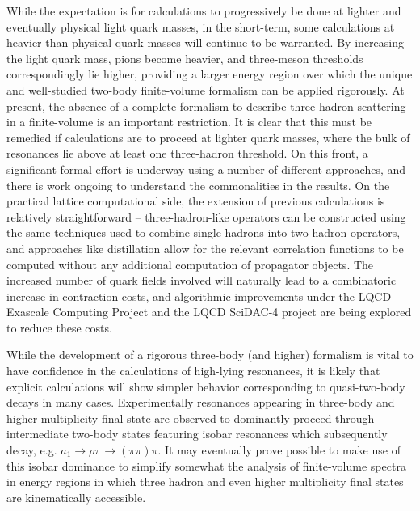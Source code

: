 While the expectation is for calculations to progressively be done at lighter and eventually physical light quark masses, in the short-term, some calculations at heavier than physical quark masses will continue to be warranted. By increasing the light quark mass, pions become heavier, and three-meson thresholds correspondingly lie higher, providing a larger energy region over which the unique and well-studied two-body finite-volume formalism can be applied rigorously. 
At present, the absence of a complete formalism to describe three-hadron scattering in a finite-volume is an important  restriction. It is clear that this must be remedied if calculations are to proceed at lighter quark masses, where the bulk of resonances lie above at least one three-hadron threshold. On this front, a significant formal effort is underway \cite{Polejaeva:2012ut,Hansen:2015zga,Hansen:2014eka,Briceno:2018aml,Doring:2018xxx} using a number of different approaches, and there is work ongoing to understand the commonalities in the results. On the practical lattice computational side, the extension of previous calculations is relatively straightforward -- three-hadron-like operators can be constructed using the same techniques used to combine single hadrons into two-hadron operators, and approaches like distillation \cite{Peardon:2009gh} allow for the relevant correlation functions to be computed without any additional computation of propagator objects. The increased number of quark fields involved will naturally lead to a combinatoric increase in contraction costs, and algorithmic improvements under the LQCD Exascale Computing Project and the LQCD SciDAC-4 project are being explored to reduce these costs.

While the development of a rigorous three-body (and higher) formalism is vital to have confidence in the calculations of high-lying resonances, it is likely that explicit calculations will show simpler behavior corresponding to quasi-two-body decays in many cases. Experimentally resonances appearing in three-body and higher multiplicity final state are observed to dominantly proceed through intermediate two-body states featuring isobar resonances which subsequently decay, e.g. $a_1 \to \rho \pi \to (\pi\pi) \pi$. It may eventually prove possible to make use of this isobar dominance to simplify somewhat the analysis of finite-volume spectra in energy regions in which three hadron and even higher multiplicity final states are kinematically accessible.

